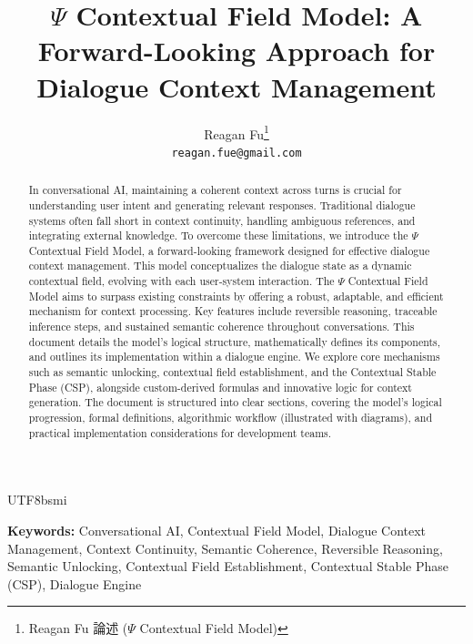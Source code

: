 \documentclass{article}
\title{\Large \textbf{$\Psi$ Contextual Field Model: A Forward-Looking Approach for Dialogue Context Management}}
\author{
  Reagan Fu\thanks{Reagan Fu 論述 ($\Psi$ Contextual Field Model)} \\
  \texttt{reagan.fue@gmail.com}
}
\begin{document}
\begin{CJK*}{UTF8}{bsmi} %

\maketitle %

\begin{abstract}
In conversational AI, maintaining a coherent context across turns is crucial for understanding user intent and generating relevant responses. Traditional dialogue systems often fall short in context continuity, handling ambiguous references, and integrating external knowledge. To overcome these limitations, we introduce the $\Psi$ Contextual Field Model, a forward-looking framework designed for effective dialogue context management. This model conceptualizes the dialogue state as a dynamic contextual field, evolving with each user-system interaction. The $\Psi$ Contextual Field Model aims to surpass existing constraints by offering a robust, adaptable, and efficient mechanism for context processing. Key features include reversible reasoning, traceable inference steps, and sustained semantic coherence throughout conversations. This document details the model's logical structure, mathematically defines its components, and outlines its implementation within a dialogue engine. We explore core mechanisms such as semantic unlocking, contextual field establishment, and the Contextual Stable Phase (CSP), alongside custom-derived formulas and innovative logic for context generation. The document is structured into clear sections, covering the model's logical progression, formal definitions, algorithmic workflow (illustrated with diagrams), and practical implementation considerations for development teams.
\end{abstract}

\textbf{Keywords:} Conversational AI, Contextual Field Model, Dialogue Context Management, Context Continuity, Semantic Coherence, Reversible Reasoning, Semantic Unlocking, Contextual Field Establishment, Contextual Stable Phase (CSP), Dialogue Engine

\tableofcontents


\end{CJK*}
\end{document}
